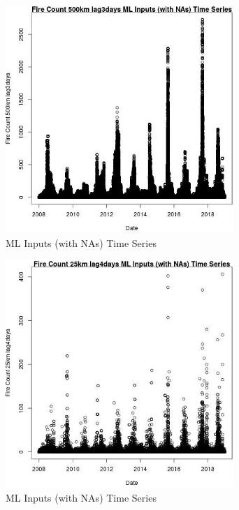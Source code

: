 \begin{figure} 
\centering  
\includegraphics[width=0.77\textwidth]{Code_Outputs/Report_ML_input_PM25_Step4_part_f_de_duplicated_aves_prioritize_24hr_obswNAs_Fire_Count_500km_lag3daysvDate.jpg} 
\caption{\label{fig:Report_ML_input_PM25_Step4_part_f_de_duplicated_aves_prioritize_24hr_obswNAsFire_Count_500km_lag3daysvDate}ML Inputs (with NAs) Time Series} 
\end{figure} 
 

\begin{figure} 
\centering  
\includegraphics[width=0.77\textwidth]{Code_Outputs/Report_ML_input_PM25_Step4_part_f_de_duplicated_aves_prioritize_24hr_obswNAs_Fire_Count_25km_lag4daysvDate.jpg} 
\caption{\label{fig:Report_ML_input_PM25_Step4_part_f_de_duplicated_aves_prioritize_24hr_obswNAsFire_Count_25km_lag4daysvDate}ML Inputs (with NAs) Time Series} 
\end{figure} 
 

